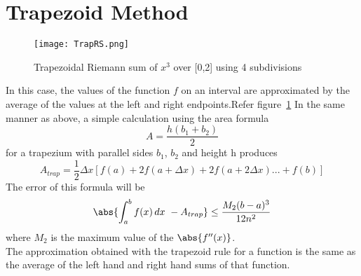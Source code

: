 \documentclass[a4paper, 12pt]{report}
\begin{document}
    \section{Trapezoid Method}
     \begin{figure}[!h]
    \centering
    \texttt{[image: TrapRS.png]}
    \caption{Trapezoidal Riemann sum of $x^{3}$ over [0,2] using 4 subdivisions}
    \label{fig:TrapRS}
    \end{figure}
    In this case, the values of the function $f$ on an interval are approximated by the average of the values at the left and right endpoints.Refer figure~\ref{fig:TrapRS} In the same manner as above, a simple calculation using the area formula
    \begin{equation}
        A = \frac{h(b_{1}+b_{2})}{2}
    \end{equation}
    for a trapezium with parallel sides $b_{1}$, $b_{2}$ and height h produces
     \begin{equation}
        A_{trap} = \frac{1}{2}\Delta x[f(a) + 2f(a+\Delta x ) + 2f(a+2\Delta x ) ...+ f(b)]
    \end{equation}
    The error of this formula will be
     \begin{equation}
        \abs{ \int_{a}^{b} f(x)\,dx\  - A_{trap}} \leq \frac{M_{2}(b-a)^{3}}{12n^{2}}
    \end{equation}
    where $M_{2}$ is the maximum value of the $\abs{f''(x)}$.\\
    The approximation obtained with the trapezoid rule for a function is the same as the average of the left hand and right hand sums of that function.
   
\end{document}
